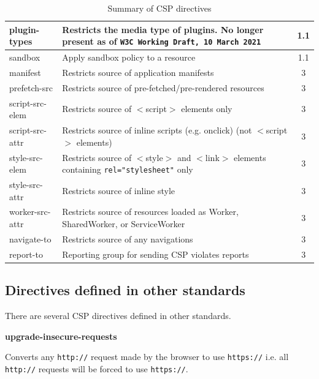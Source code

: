 \documentclass{mscreport}
\begin{document}
\begin{table}
\begin{center}
\begin{tabular}{|l|J|c|}
      \hline
      plugin-types & Restricts the media type of plugins. No longer present as of \texttt{W3C Working Draft, 10 March 2021} \cite{noauthor_undated-xf} & 1.1\\
      \hline
      sandbox & Apply sandbox policy to a resource & 1.1\\
      \hline
      manifest & Restricts source of application manifests & 3 \\
      \hline
      prefetch-src & Restricts source of pre-fetched/pre-rendered resources & 3 \\
      \hline
      script-src-elem & Restricts source of $<$script$>$ elements only & 3 \\
      \hline
      script-src-attr & Restricts source of inline scripts (e.g. onclick) (not $<$script$>$ elements) & 3 \\
      \hline
      style-src-elem & Restricts source of $<$style$>$ and $<$link$>$ elements containing \texttt{rel="stylesheet"} only & 3 \\
      \hline
      style-src-attr & Restricts source of inline style & 3 \\
      \hline
      worker-src-attr & Restricts source of resources loaded as Worker, SharedWorker, or ServiceWorker & 3 \\
      \hline
      navigate-to & Restricts source of any navigations & 3 \\
      \hline
      report-to & Reporting group for sending CSP violates reports & 3 \\
      \hline
    \end{tabular}
    \caption{Summary of CSP directives}
    \label{table:cpsdirectives1} %
  \end{center}
\end{table}

\clearpage
\newpage

\subsection{Directives defined in other standards}

There are several CSP directives defined in other standards.

\vspace{0.7cm} \noindent
\textbf{upgrade-insecure-requests}

\vspace{0.3cm} \noindent
Converts any \texttt{http://} request made by the browser to use \texttt{https://} i.e. all \texttt{http://} requests will be forced to use \texttt{https://}.
\end{document}

